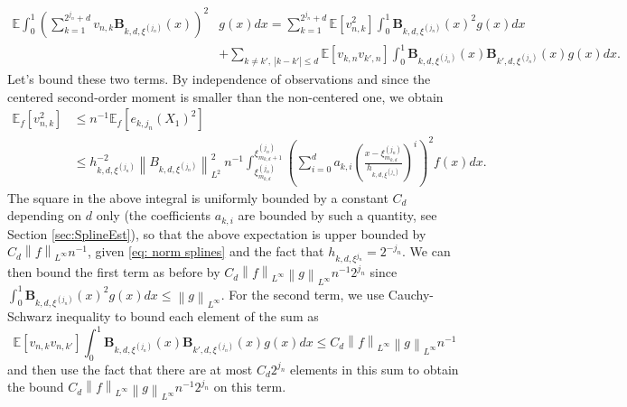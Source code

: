 \documentclass[preprint]{imsart}
\newcommand\norm[1]{\left\lVert#1\right\rVert}
\numberwithin{equation}{section}
\newcounter{cond}
\begin{document}
\begin{appendix}
\begin{align*}
\mathbb{E}\int_0^1 \left(\sum_{k=1}^{2^{j_n}+d} v_{n,k}\mathbf{B}_{k,d,\xi^{(j_n)}}(x)\right)^2 &g(x) dx =  \sum_{k=1}^{2^{j_n}+d} \mathbb{E}\left[v_{n,k}^2\right]  \int_0^1\mathbf{B}_{k,d,\xi^{(j_n)}}(x)^2 g(x)dx \\
&+\sum_{k\neq k',\ |k-k'|\leq d} \mathbb{E}\left[v_{k,n}v_{k',n}\right]\int_0^1\mathbf{B}_{k,d,\xi^{(j_n)}}(x)\mathbf{B}_{k',d,\xi^{(j_n)}}(x) g(x)dx.
\end{align*}
Let's bound these two terms. By independence of observations and since the centered second-order moment is smaller than the non-centered one, we obtain 
\begin{align}
\mathbb{E}_f\left[v_{n,k}^2\right]&\leq n^{-1}\mathbb{E}_f\left[e_{k,j_n}(X_1)^2\right]\nonumber\\
&\leq h_{k,d,\xi^{(j_n)}}^{-2} \norm{B_{k,d,\xi^{(j_n)}}}_{L^2}^2\ n^{-1}\int_{\xi^{(j_n)}_{m_{k,d}}}^{\xi^{(j_n)}_{m_{k,d}+1}} \left(\sum_{i=0}^d a_{k,i}\left(\frac{x-\xi^{(j_n)}_{m_{k,d}}}{h_{k,d,\xi^{(j_n)}}}\right)^i\right)^2f(x)dx.\label{eq: bound empirical coefficient}
\end{align}
The square in the above integral is uniformly bounded by a constant $C_d$ depending on $d$ only (the coefficients $a_{k,i}$ are bounded by such a quantity, see Section \ref{sec:SplineEst}), so that the above expectation is upper bounded by $C_d \norm{f}_{L^\infty} n^{-1}$, given \eqref{eq: norm splines} and the fact that $h_{k,d,\xi^{j_n}}=2^{-j_n}$. We can then bound the first term as before by $C_d\norm{f}_{L^\infty} \norm{g}_{L^\infty} n^{-1}2^{j_n}$ since $\int_0^1\mathbf{B}_{k,d,\xi^{(j_n)}}(x)^2 g(x)dx\leq \norm{g}_{L^\infty}$. For the second term, we use Cauchy-Schwarz inequality to bound each element of the sum as
\[ \mathbb{E}\left[v_{n,k}v_{n,k'}\right]\int_0^1\mathbf{B}_{k,d,\xi^{(j_n)}}(x)\mathbf{B}_{k',d,\xi^{(j_n)}}(x) g(x)dx\leq C_d \norm{f}_{L^\infty} \norm{g}_{L^\infty} n^{-1}\]and then use the fact that there are at most $C_d 2^{j_n}$ elements in this sum to obtain the bound $C_d \norm{f}_{L^\infty} \norm{g}_{L^\infty} n^{-1} 2^{j_n}$ on this term.\\


\end{appendix}
\end{document}
